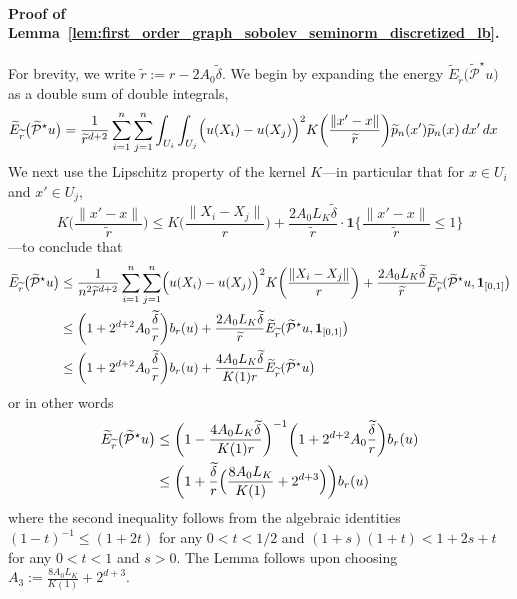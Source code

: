 \documentclass[twoside]{article}
\newcommand{\1}{\mathbf{1}}
\newcommand{\mc}[1]{\mathcal{#1}}
\newcommand{\wt}[1]{\widetilde{#1}}
\theoremstyle{definition}
\theoremstyle{remark}
\begin{document}
\paragraph{Proof of Lemma~\ref{lem:first_order_graph_sobolev_seminorm_discretized_lb}.}
For brevity, we write $\wt{r} := r - 2A_0\wt{\delta}$. We begin by expanding the energy $\wt{E}_{\wt{r}}\bigl(\wt{\mc{P}}^{\star}u\bigr)$ as a double sum of double integrals,
\begin{align*}
\wt{E}_{\wt{r}}\bigl(\wt{\mc{P}}^{\star}u\bigr) & = \frac{1}{\wt{r}^{d + 2}} \sum_{i = 1}^{n} \sum_{j = 1}^{n} \int_{U_i} \int_{U_j} \Bigl(u(X_i) - u(X_j)\Bigr)^2 K\biggl(\frac{\|x' - x\|}{\wt{r}}\biggr) \wt{p}_n(x') \wt{p}_n(x) \,dx' \,dx
\end{align*}
We next use the Lipschitz property of the kernel $K$---in particular that for $x \in U_i$ and $x' \in U_j$,
\begin{equation*}
K\biggl(\frac{\|x' - x\|}{\wt{r}}\biggr) \leq K\biggl(\frac{\|X_i - X_j\|}{r}\biggr) + \frac{2A_0L_K\wt{\delta}}{\wt{r}} \cdot \1\biggl\{\frac{\|x' - x\|}{\wt{r}} \leq 1\biggr\}
\end{equation*}
---to conclude that
\begin{align}
\wt{E}_{\wt{r}}\bigl(\wt{\mc{P}}^{\star}u\bigr) & \leq \frac{1}{n^2\wt{r}^{d + 2}} \sum_{i = 1}^{n} \sum_{j = 1}^{n} \Bigl(u(X_i) - u(X_j)\Bigr)^2 K\biggl(\frac{\|X_i - X_j\|}{r}\biggr) + \frac{2A_0L_K\wt{\delta}}{\wt{r}}\wt{E}_{\wt{r}}(\wt{\mc{P}}^{\star}u,\1_{[0,1]}\bigr) \nonumber \\
& \leq \biggl(1 + 2^{d + 2}A_0\frac{\wt{\delta}}{r}\biggr) b_r(u) + \frac{2A_0L_K\wt{\delta}}{\wt{r}}\wt{E}_{\wt{r}}(\wt{\mc{P}}^{\star}u,\1_{[0,1]}\bigr) \nonumber \\
& \leq \biggl(1 + 2^{d + 2}A_0\frac{\wt{\delta}}{r}\biggr) b_r(u) + \frac{4A_0L_K\wt{\delta}}{K(1)r} \wt{E}_{\wt{r}}(\wt{\mc{P}}^{\star}u\bigr) \nonumber 
\end{align}
or in other words
\begin{align*}
\wt{E}_{\wt{r}}\bigl(\wt{\mc{P}}^{\star}u\bigr) & \leq \biggl(1 - \frac{4A_0L_K\wt{\delta}}{K(1)r}\biggr)^{-1}\biggl(1 + 2^{d + 2}A_0\frac{\wt{\delta}}{r}\biggr) b_r(u) \\
& \leq \biggl(1 + \frac{\wt{\delta}}{r}\Bigl(\frac{8A_0L_K}{K(1)} + 2^{d + 3}\Bigr)\biggr) b_r(u)
\end{align*}
where the second inequality follows from the algebraic identities $(1 - t)^{-1} \leq (1 + 2t)$ for any $0 < t < 1/2$ and $(1 + s)(1 + t) < 1 + 2s + t$ for any $0 < t < 1$ and $s > 0$. The Lemma follows upon choosing $A_3 := \frac{8A_0L_K}{K(1)} + 2^{d + 3}$. 
\end{document}
